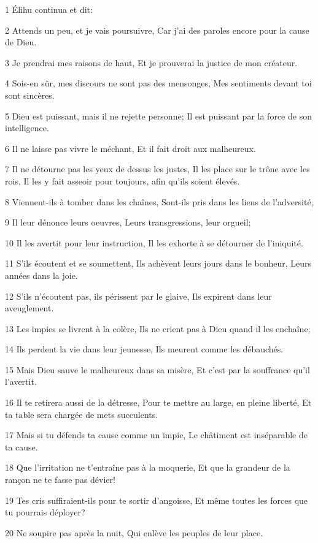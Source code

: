 \par 1 Élihu continua et dit:
\par 2 Attends un peu, et je vais poursuivre, Car j'ai des paroles encore pour la cause de Dieu.
\par 3 Je prendrai mes raisons de haut, Et je prouverai la justice de mon créateur.
\par 4 Sois-en sûr, mes discours ne sont pas des mensonges, Mes sentiments devant toi sont sincères.
\par 5 Dieu est puissant, mais il ne rejette personne; Il est puissant par la force de son intelligence.
\par 6 Il ne laisse pas vivre le méchant, Et il fait droit aux malheureux.
\par 7 Il ne détourne pas les yeux de dessus les justes, Il les place sur le trône avec les rois, Il les y fait asseoir pour toujours, afin qu'ils soient élevés.
\par 8 Viennent-ils à tomber dans les chaînes, Sont-ils pris dans les liens de l'adversité,
\par 9 Il leur dénonce leurs oeuvres, Leurs transgressions, leur orgueil;
\par 10 Il les avertit pour leur instruction, Il les exhorte à se détourner de l'iniquité.
\par 11 S'ils écoutent et se soumettent, Ils achèvent leurs jours dans le bonheur, Leurs années dans la joie.
\par 12 S'ils n'écoutent pas, ils périssent par le glaive, Ils expirent dans leur aveuglement.
\par 13 Les impies se livrent à la colère, Ils ne crient pas à Dieu quand il les enchaîne;
\par 14 Ils perdent la vie dans leur jeunesse, Ils meurent comme les débauchés.
\par 15 Mais Dieu sauve le malheureux dans sa misère, Et c'est par la souffrance qu'il l'avertit.
\par 16 Il te retirera aussi de la détresse, Pour te mettre au large, en pleine liberté, Et ta table sera chargée de mets succulents.
\par 17 Mais si tu défends ta cause comme un impie, Le châtiment est inséparable de ta cause.
\par 18 Que l'irritation ne t'entraîne pas à la moquerie, Et que la grandeur de la rançon ne te fasse pas dévier!
\par 19 Tes cris suffiraient-ils pour te sortir d'angoisse, Et même toutes les forces que tu pourrais déployer?
\par 20 Ne soupire pas après la nuit, Qui enlève les peuples de leur place.
